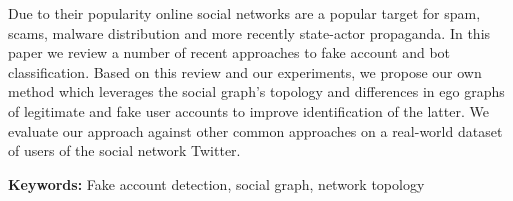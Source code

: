 \noindent Due to their popularity online social networks are a popular target for spam, scams, malware distribution and more recently state-actor propaganda. In this paper we review a number of recent approaches to fake account and bot classification. Based on this review and our experiments, we propose our own method which leverages the social graph's topology and differences in ego graphs of legitimate and fake user accounts to improve identification of the latter. We evaluate our approach against other common approaches on a real-world dataset of users of the social network Twitter.

\medskip

\noindent \textbf{Keywords:} Fake account detection, social graph, network topology